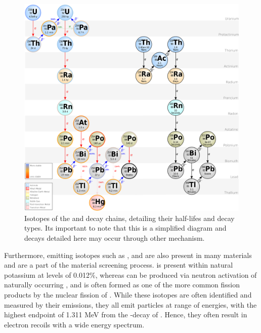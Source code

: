\begin{figure}[t!]
    \begin{center}
        \includegraphics[scale=0.75]{Chapter_3/Figures/U_Th_Chain.png}
        \caption[Isotopes if the \UTTE{} and \ThTTT{} decay chains, detailing their half-lifes and decay types.]%
        {Isotopes of the \UTTE{} and \ThTTT{} decay chains, detailing their half-lifes and decay types. Its important to note that this is a simplified diagram and decays detailed here may occur through other mechanism.}
        \label{fig:u_238_and_th_232}
    \end{center}
\end{figure}
%


Furthermore, \gray{} emitting isotopes such as \KFZ{}, \CoSZ{} and \CsOTS{} are also present in many materials and are a part of the material screening process. \KFZ{} is present within natural potassium at levels of 0.012\%, whereas \CoSZ{} can be produced via neutron activation of naturally occurring \CoFN{}, and \CsOTS{} is often formed as one of the more common fission products by the nuclear fission of \UTTF{}. While these isotopes are often identified and measured by their \gray{} emissions, they all emit \beta particles at range of energies, with the highest endpoint of 1.311 MeV from the \beta-decay of \KFZ{}. Hence, they often result in electron recoils with a wide energy spectrum.


